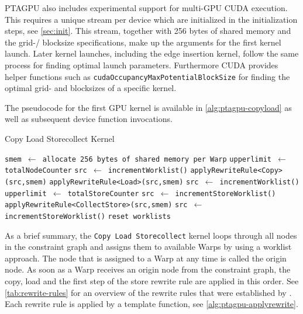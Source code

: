 PTAGPU also includes experimental support for multi-GPU CUDA execution. This requires a unique stream per device which are initialized in the initialization steps, see \autoref{sec:init}.
This stream, together with 256 bytes of shared memory and the grid-/ blocksize specifications, make up the arguments for the first kernel launch. Later kernel launches, including the edge insertion kernel, follow the same process for finding optimal launch parameters. Furthermore CUDA provides helper functions such as \verb|cudaOccupancyMaxPotentialBlockSize| for finding the optimal grid- and blocksizes of a specific kernel.

The pseudocode for the first GPU kernel is available in \autoref{alg:ptagpu-copyload} as well as subsequent device function invocations.
\begin{algorithm}
    \caption{Copy Load Storecollect Kernel}\label{alg:ptagpu-copyload}
    \begin{algorithmic}
        \State \texttt{smem $\leftarrow$ allocate 256 bytes of shared memory per Warp}
        \State \texttt{upperlimit $\leftarrow$ totalNodeCounter}
        \State \texttt{src $\leftarrow$ incrementWorklist()}
        \State \texttt{applyRewriteRule<Copy>(src,smem)} 
        \State \texttt{applyRewriteRule<Load>(src,smem)}
        \State \texttt{src $\leftarrow$ incrementWorklist()}
        \EndWhile
        \State \texttt{upperlimit $\leftarrow$ totalStoreCounter}
        \State \texttt{src $\leftarrow$ incrementStoreWorklist()}
        \State \texttt{applyRewriteRule<CollectStore>(src,smem)} 
        \State \texttt{src $\leftarrow$ incrementStoreWorklist()}
        \EndWhile
        \State \texttt{reset worklists}
    \end{algorithmic}
\end{algorithm}
As a brief summary, the \verb|Copy Load Storecollect| kernel loops through all nodes in the constraint graph and assigns them to available Warps by using a worklist approach.
The node that is assigned to a Warp at any time is called the origin node.
As soon as a Warp receives an origin node from the constraint graph, the copy, load and the first step of the store rewrite rule are applied in this order. See \autoref{tab:rewrite-rules} for an overview of the rewrite rules that were established by \cite{mendez2012gpu}.
Each rewrite rule is applied by a template function, see \autoref{alg:ptagpu-applyrewrite}.
